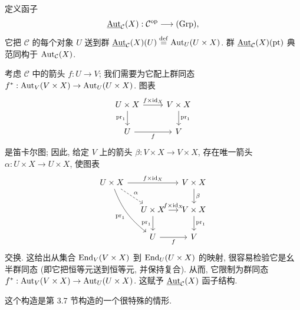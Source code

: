 定义函子
\[
\underline{\operatorname{Aut}}_{\mathcal C}(X):\mathcal C^{\mathrm{op}}\longrightarrow(\mathrm{Grp}),
\]
它把 $\mathcal C$ 的每个对象 $U$ 送到群 $\underline{\operatorname{Aut}}_{\mathcal C}(X)(U)\overset{\mathrm{def}}=\operatorname{Aut}_U(U\times X)$. 群 $\underline{\operatorname{Aut}}_{\mathcal C}(X)(\mathrm{pt})$ 典范同构于 $\operatorname{Aut}_{\mathcal C}(X)$.

考虑 $\mathcal C$ 中的箭头 $f:U\to V$; 我们需要为它配上群同态 $f^*:\operatorname{Aut}_V(V\times X)\to\operatorname{Aut}_U(U\times X)$. 图表
\[
\begin{tikzcd}
U\times X\arrow[r,"f\times\mathrm{id}_X"]\arrow[d,"\mathrm{pr}_1"']&V\times X\arrow[d,"\mathrm{pr}_1"]\\
U\arrow[r,"f"']&V
\end{tikzcd}
\]
是笛卡尔图; 因此, 给定 $V$ 上的箭头 $\beta:V\times X\to V\times X$, 存在唯一箭头 $\alpha:U\times X\to U\times X$, 使图表
\[
\begin{tikzcd}[column sep=small]
U\times X\arrow[rr,"f\times\mathrm{id}_X"]\arrow[dr,dashed,"\alpha"]\arrow[ddr,bend right=15,"\mathrm{pr}_1"']&&V\times X\arrow[d,"\beta"]\\
&U\times X\arrow[r,"f\times\mathrm{id}_X"]\arrow[d,"\mathrm{pr}_1"']&V\times X\arrow[d,"\mathrm{pr}_1"]\\
&U\arrow[r,"f"']&V
\end{tikzcd}
\]
交换. 这给出从集合 $\operatorname{End}_V(V\times X)$ 到 $\operatorname{End}_U(U\times X)$ 的映射, 很容易检验它是幺半群同态 (即它把恒等元送到恒等元, 并保持复合). 从而, 它限制为群同态 $f^*:\operatorname{Aut}_V(V\times X)\to\operatorname{Aut}_U(U\times X)$. 这赋予 $\underline{\operatorname{Aut}}_{\mathcal C}(X)$ 函子结构.

这个构造是第 3.7 节构造的一个很特殊的情形.

